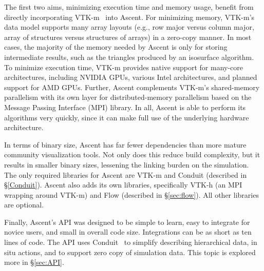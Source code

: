 \documentclass[graybox]{svmult}
\newcommand{\fix}[1]{\textcolor{red}{#1}} %
\begin{document}
The first two aims, minimizing execution time and memory usage, benefit from directly
incorporating VTK-m~\cite{Moreland:CGA2016} into Ascent.
%
For minimizing memory,
VTK-m's data model supports many array layouts (e.g., row major versus
column major, array of structures versus structures of arrays)
in a zero-copy manner.
%
In most cases, the majority of the memory needed by Ascent is only for
storing intermediate results, such as the triangles produced by an isosurface algorithm.
%
To minimize execution time,
VTK-m provides native support for many-core architectures,
including NVIDIA GPUs, various Intel architectures,
and planned support for AMD GPUs.
%
Further, Ascent complements VTK-m's shared-memory parallelism with
its own layer for distributed-memory parallelism based on the
Message Passing Interface (MPI) library.
%
In all, Ascent is able to perform its algorithms very quickly,
since it can make full use of the underlying hardware architecture.
%

In terms of binary size, Ascent has far
fewer dependencies than more mature community visualization tools.
%
Not only does this reduce build complexity, but it results in
smaller binary sizes, lessening the linking burden on the simulation.
%
The only required libraries for Ascent are VTK-m
and Conduit (described in \S\ref{Conduit}).
%
Ascent also adds its own libraries, specifically VTK-h (an MPI wrapping around
VTK-m) and Flow (described in \S\ref{sec:flow}).
%
All other libraries are optional.

Finally, Ascent's API was designed to be simple to learn,
easy to integrate for novice users, and small in overall code size.
%
Integrations can be as short as ten lines of code.
%
The API uses Conduit~\cite{conduit_main} to simplify describing hierarchical data, in situ actions,
and to support zero copy of simulation data.
%
This topic is explored more in \S\ref{sec:API}.
%
\end{document}

